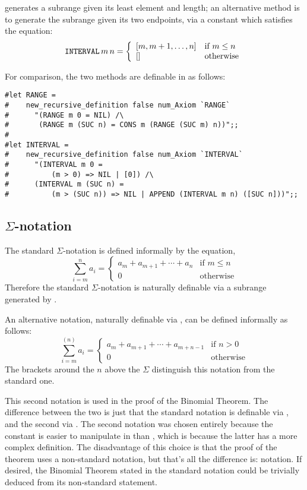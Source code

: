 \verb@RANGE@ generates a subrange given its least element and length;
an alternative method is to generate the subrange given its two endpoints,
via a constant \verb@INTERVAL@ which satisfies the equation:
\[
\verb@INTERVAL@\,m\,n =
    \left\{\begin{array}{ll}
    [m, m+1, \ldots, n] & \mbox{if $m \leq n$} \\
    {}[] & \mbox{otherwise}
    \end{array}\right.
\]

For comparison, the two methods are definable in \HOL{} as follows:
\begin{session}
\begin{verbatim}
#let RANGE = 
#    new_recursive_definition false num_Axiom `RANGE`
#      "(RANGE m 0 = NIL) /\
#       (RANGE m (SUC n) = CONS m (RANGE (SUC m) n))";;
#
#let INTERVAL =
#    new_recursive_definition false num_Axiom `INTERVAL`
#      "(INTERVAL m 0 =
#          (m > 0) => NIL | [0]) /\
#      (INTERVAL m (SUC n) =
#          (m > (SUC n)) => NIL | APPEND (INTERVAL m n) ([SUC n]))";;
\end{verbatim}
\end{session}

\subsection{$\Sigma$-notation}

The standard $\Sigma$-notation is defined informally by the equation,
\[
\sum_{i=m}^n a_i =
    \left\{\begin{array}{ll}
    a_m + a_{m+1} + \cdots + a_n & \mbox{if $m \leq n$} \\
    0 & \mbox{otherwise}
    \end{array}\right.
\]
Therefore the standard $\Sigma$-notation is naturally definable via
a subrange generated by \verb@INTERVAL@.

An alternative notation, naturally definable via \verb@RANGE@, can be
defined informally as follows:
\[
\sum_{i=m}^{(n)} a_i =
    \left\{\begin{array}{ll}
    a_m + a_{m+1} + \cdots + a_{m+n-1} & \mbox{if $n > 0$} \\
    0 & \mbox{otherwise}
    \end{array}\right.
\]
The brackets around the $n$ above the $\Sigma$ distinguish this
notation from the standard one.

This second notation is used in the \HOL{} proof of the Binomial Theorem.  
The difference between the two is just that the standard notation is 
definable via \verb@INTERVAL@, and the second via \verb@RANGE@. The second 
notation was chosen entirely because the constant \verb@RANGE@ is easier 
to manipulate in \HOL{} than \verb@INTERVAL@, which is because the latter 
has a more complex definition. The disadvantage of this choice is that 
the proof of the theorem uses a non-standard notation, but that's all the 
difference is: notation.  If desired, the Binomial Theorem stated in the 
standard notation could be trivially deduced from its non-standard statement.

